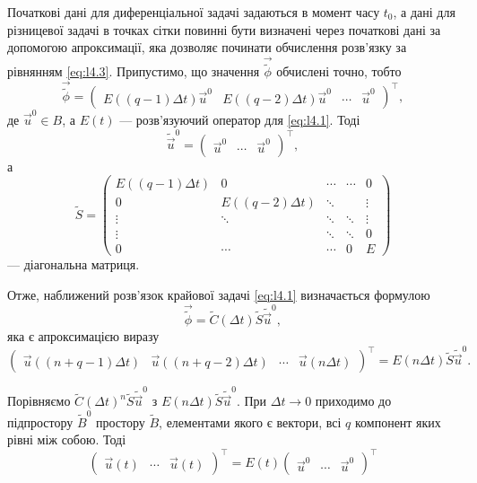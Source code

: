 Початкові дані для диференціальної задачі задаються в момент часу $t_0$, а дані для різницевої задачі в точках сітки повинні бути визначені через початкові дані за допомогою апроксимації, яка дозволяє починати обчислення розв'язку за рівнянням \eqref{eq:l4.3}. Припустимо, що значення $\vec{\tilde{\phi}}$ обчислені точно, тобто 
\begin{equation}
    \vec{\tilde{\phi}} = \begin{pmatrix} E((q - 1)\Delta t) \vec u^0 & E((q - 2)\Delta t) \vec u^0 & \cdots & \vec u^0 \end{pmatrix}^\intercal,
\end{equation}
де $\vec u^0 \in B$, а $E(t)$ --- розв'язуючий оператор для \eqref{eq:l4.1}. Тоді 
\begin{equation}
    \tilde{\vec{u}}^0 = \begin{pmatrix} \vec u^0 & \cdots & \vec u^0 \end{pmatrix}^\intercal,
\end{equation}
а
\begin{equation}
    \tilde S = \begin{pmatrix}
        E((q - 1) \Delta t) & 0 & \cdots & \cdots & 0 \\
        0 & E((q - 2) \Delta t) & \ddots & & \vdots \\
        \vdots & \ddots & \ddots & \ddots & \vdots \\
        \vdots & & \ddots & \ddots & 0 \\
        0 & \cdots & \cdots & 0 & E
    \end{pmatrix}
\end{equation}
---	діагональна матриця. \medskip

Отже, наближений розв'язок крайової задачі \eqref{eq:l4.1} визначається формулою 
\begin{equation}
    \vec{\tilde{\phi}} = \tilde C(\Delta t) \tilde S \tilde{\vec{u}}^0,
\end{equation}
яка є апроксимацією виразу
\begin{equation}
    \begin{pmatrix} \vec u ((n + q - 1) \Delta t) & \vec u ((n + q - 2) \Delta t) & \cdots & \vec u (n \Delta t) \end{pmatrix}^\intercal = E (n \Delta t) \tilde S \tilde{\vec{u}}^0.
\end{equation}

Порівняємо $\tilde C(\Delta t)^n \tilde S \tilde{\vec{u}}^0$ з $E (n \Delta t) \tilde S \tilde{\vec{u}}^0$. При $\Delta t \to 0$ приходимо до підпростору $\tilde B^0$ простору $\tilde B$, елементами якого є вектори, всі $q$ компонент яких рівні між собою. Тоді
\begin{equation}
    \begin{pmatrix} \vec u(t) & \cdots & \vec u(t) \end{pmatrix}^\intercal = E(t) \begin{pmatrix} \vec u^0 & \cdots & \vec u^0 \end{pmatrix}^\intercal
\end{equation}

